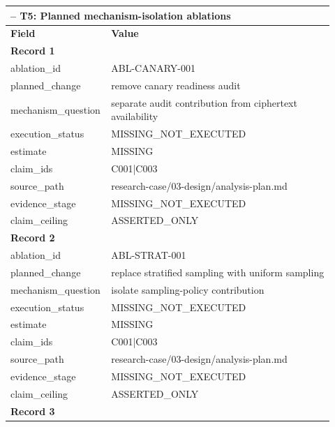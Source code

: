\begingroup
\setlength{\tabcolsep}{2pt}
\small\sloppy
\begin{longtable}{|p{0.24\linewidth}|p{0.68\linewidth}|}
\hline
\multicolumn{2}{|l|}{\KeystoneDraftTableNotice{} -- T5: Planned mechanism-isolation ablations} \\ \hline
\textbf{Field} & \textbf{Value} \\ \hline
\multicolumn{2}{|l|}{\textbf{Record 1}} \\ \hline
ablation\_\allowbreak{}id & ABL-CANARY-001 \\ \hline
planned\_\allowbreak{}change & remove canary readiness audit \\ \hline
mechanism\_\allowbreak{}question & separate audit contribution from ciphertext availability \\ \hline
execution\_\allowbreak{}status & MISSING\_\allowbreak{}NOT\_\allowbreak{}EXECUTED \\ \hline
estimate & MISSING \\ \hline
claim\_\allowbreak{}ids & C001|C003 \\ \hline
source\_\allowbreak{}path & research-case/03-design/analysis-plan.md \\ \hline
evidence\_\allowbreak{}stage & MISSING\_\allowbreak{}NOT\_\allowbreak{}EXECUTED \\ \hline
claim\_\allowbreak{}ceiling & ASSERTED\_\allowbreak{}ONLY \\ \hline
\multicolumn{2}{|l|}{\textbf{Record 2}} \\ \hline
ablation\_\allowbreak{}id & ABL-STRAT-001 \\ \hline
planned\_\allowbreak{}change & replace stratified sampling with uniform sampling \\ \hline
mechanism\_\allowbreak{}question & isolate sampling-policy contribution \\ \hline
execution\_\allowbreak{}status & MISSING\_\allowbreak{}NOT\_\allowbreak{}EXECUTED \\ \hline
estimate & MISSING \\ \hline
claim\_\allowbreak{}ids & C001|C003 \\ \hline
source\_\allowbreak{}path & research-case/03-design/analysis-plan.md \\ \hline
evidence\_\allowbreak{}stage & MISSING\_\allowbreak{}NOT\_\allowbreak{}EXECUTED \\ \hline
claim\_\allowbreak{}ceiling & ASSERTED\_\allowbreak{}ONLY \\ \hline
\multicolumn{2}{|l|}{\textbf{Record 3}} \\ \hline

\end{longtable}
